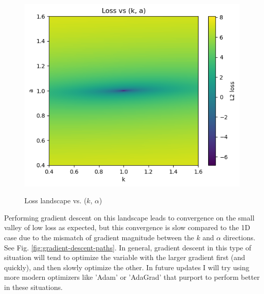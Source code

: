 \documentclass[]{article}
\begin{document}
\begin{figure}[H]
	\caption{Loss landscape vs. ($k$, $\alpha$)}
	\centering
	\includegraphics[scale=0.70]{loss-landscape.png}
	\label{fig:loss-landscape}
\end{figure}

Performing gradient descent on this landscape leads to convergence on the small valley of low loss as expected, but this convergence is slow compared to the 1D case due to the mismatch of gradient magnitude between the $k$ and $\alpha$ directions. See Fig. \ref{fig:gradient-descent-paths}. In general, gradient descent in this type of situation will tend to optimize the variable with the larger gradient first (and quickly), and then slowly optimize the other. In future updates I will try using more modern optimizers like 'Adam'\cite{Kingma2014} or 'AdaGrad'\cite{Duchi2011}  that purport to perform better in these situations.
\end{document}
